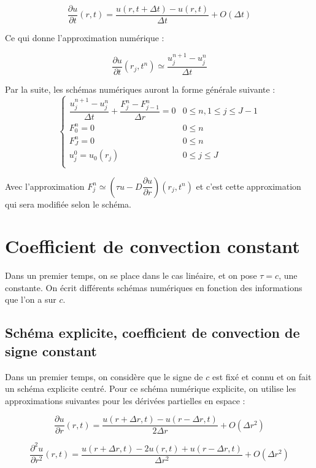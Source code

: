 \documentclass[a4paper,fleqn,leqno]{article}
\begin{document}
$$\dfrac{\partial u}{\partial t}(r,t) = \dfrac{u(r,t+\Delta t) - u(r,t)}{\Delta t} + O(\Delta t)$$

Ce qui donne l'approximation numérique :

$$\dfrac{\partial u}{\partial t}(r_j,t^n) \simeq \dfrac{u_j^{n+1} - u_j^n}{\Delta t}$$

Par la suite, les schémas numériques auront la forme générale suivante :
\begin{equation*}\label{eq:S}\tag{$S$}
\begin{cases}
\dfrac{u_j^{n+1} - u_j^n}{\Delta t} +\dfrac{F^n_j - F^n_{j-1}}{\Delta r} = 0 & 0\leq n, 1\leq j\leq J-1 \\
F^n_0 = 0 & 0\leq n \\
F^n_J = 0 & 0\leq n \\
u^0_j = u_0(r_j) & 0\leq j\leq J \\
\end{cases}
\end{equation*}

Avec l'approximation $F^n_j\simeq (\tau u - D \dfrac{\partial u}{\partial r})(r_j,t^n)$ et c'est cette approximation qui sera modifiée selon le schéma.


\section{Coefficient de convection constant}
Dans un premier temps, on se place dans le cas linéaire, et on pose $\tau = c$, une constante. On écrit différents schémas numériques en fonction des informations que l'on a sur $c$.

\subsection{Schéma explicite, coefficient de convection de signe constant}

Dans un premier temps, on considère que le signe de $c$ est fixé et connu et on fait un schéma explicite centré. Pour ce schéma numérique explicite, on utilise les approximations suivantes pour les dérivées partielles en espace :

$$\dfrac{\partial u}{\partial r}(r,t) = \dfrac{u(r+\Delta r,t) - u(r-\Delta r,t)}{2\Delta r} + O(\Delta r^2) $$

$$\dfrac{\partial^2 u}{\partial r^2}(r,t) = \dfrac{u(r+\Delta r,t) - 2u(r,t) + u(r-\Delta r,t)}{\Delta r^2} + O(\Delta r^2) $$
\end{document}
